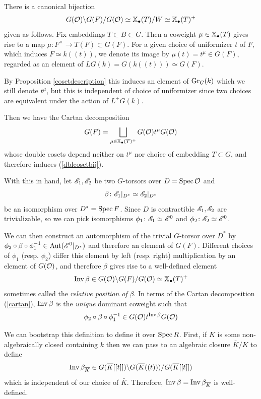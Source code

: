 \documentclass[12pt]{article}
\begin{document}
There is a canonical bijection
\begin{equation}\label{dblcosetbij}
    G(\mathcal{O}) \backslash G(F) / G(\mathcal{O}) \simeq \mathbb{X}_{\bullet}(T) / W \simeq \mathbb{X}_{\bullet}(T)^+
\end{equation}
given as follows. Fix embeddings $T \subset B \subset G$. Then a coweight $\mu \in \mathbb{X}_{\bullet}(T)$ gives rise to a map $\mu \colon F^{\times} \to T(F) \subset G(F)$. For a given choice of uniformizer $t$ of $F$, which induces $F \simeq k((t))$, we denote its image by $\mu(t) = t^{\mu} \in G(F)$, regarded as an element of $LG(k) = G(k((t))) \simeq G(F)$.

By Proposition \ref{cosetdescription} this induces an element of $\operatorname{Gr}_G(k)$ which we still denote $t^{\mu}$, but this is independent of choice of uniformizer since two choices are equivalent under the action of $L^+G(k)$.

Then we have the Cartan decomposition
\begin{equation}\label{cartan}
    G(F) = \bigsqcup_{\mu \in \mathbb{X}_{\bullet}(T)^+} G(\mathcal{O}) t^{\mu} G(\mathcal{O})
\end{equation}
whose double cosets depend neither on $t^{\mu}$ nor choice of embedding $T \subset G$, and therefore induces (\ref{dblcosetbij}).

With this in hand, let $\mathscr{E}_1, \mathscr{E}_2$ be two $G$-torsors over $D = \operatorname{Spec} \mathcal{O}$ and
\[\beta \colon \mathscr{E}_1\vert_{D^*} \simeq \mathscr{E}_2\vert_{D^*}\]
be an isomorphism over $D^* = \operatorname{Spec} F$. Since $D$ is contractible $\mathscr{E}_1, \mathscr{E}_2$ are trivializable, so we can pick isomorphisms $\phi_1 \colon \mathscr{E}_1 \simeq \mathscr{E}^0$ and $\phi_2 \colon \mathscr{E}_2 \simeq \mathscr{E}^0$. 

We can then construct an automorphism of the trivial $G$-torsor over $D^*$ by $\phi_2 \circ \beta \circ \phi_1^{-1} \in \operatorname{Aut}(\mathscr{E}^0 \vert_{D^*})$ and therefore an element of $G(F)$. Different choices of $\phi_1$ (resp. $\phi_2$) differ this element by left (resp. right) multiplication by an element of $G(\mathcal{O})$, and therefore $\beta$ gives rise to a well-defined element 
\begin{equation}
    \operatorname{Inv} \beta \in G(\mathcal{O}) \backslash G(F) / G(\mathcal{O}) \simeq \mathbb{X}_{\bullet}(T)^+
\end{equation}
sometimes called the \textit{relative position of} $\beta$. In terms of the Cartan decomposition (\ref{cartan}), $\operatorname{Inv} \beta$ is the \textit{unique} dominant coweight such that
\[\phi_2 \circ \beta \circ \phi_1^{-1} \in G(\mathcal{O}) t^{\operatorname{Inv} \beta} G(\mathcal{O})\]

We can bootstrap this definition to define it over $\operatorname{Spec} R$. First, if $K$ is some non-algebraically closed containing $k$ then we can pass to an algebraic closure $\bar{K}/K$ to define
\[\operatorname{Inv} \beta_{\overline{K}} \in G(\overline{K}[[t]]) \backslash G(\overline{K}((t))) / G(\overline{K}[[t]])\]
which is independent of our choice of $\bar{K}$. Therefore, $\operatorname{Inv} \beta = \operatorname{Inv} \beta_{\overline{K}}$ is well-defined.
\end{document}
